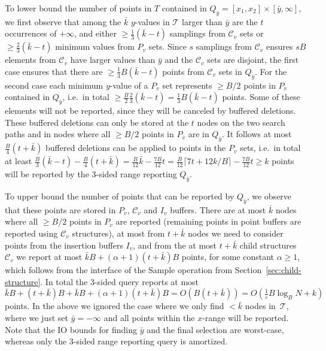 \documentclass[11pt]{article}
\begin{document}
To lower bound the number of points in $T$ contained in
$Q_{\bar{y}}=[x_1,x_2]\times[\bar{y},\infty]$, we first observe that
among the $\bar{k}$ $y$-values in $\mathcal{T}$ larger than $\bar{y}$
are the $t$ occurrences of $+\infty$, and either $\geq
\frac{1}{3}(\bar{k}-t)$ samplings from $\mathcal{C}_v$ sets or $\geq
\frac{2}{3}(\bar{k}-t)$ minimum values from $P_v$ sets. Since $s$
samplings from $\mathcal{C}_v$ ensures $sB$ elements from
$\mathcal{C}_v$ have larger values than $\bar{y}$ and the
$\mathcal{C}_v$ sets are disjoint, the first case ensures that there
are $\geq \frac{1}{3}B(\bar{k}-t)$ points from $\mathcal{C}_v$ sets in
$Q_{\bar{y}}$. For the second case each minimum $y$-value of a $P_v$
set represents $\geq B/2$ points in $P_v$ contained in $Q_{\bar{y}}$,
i.e.\ in total $\geq
\frac{B}{2}\frac{2}{3}(\bar{k}-t)=\frac{1}{3}B(\bar{k}-t)$
points. Some of these elements will not be reported, since they will
be canceled by buffered deletions. These buffered deletions can only
be stored at the $t$ nodes on the two search paths and in nodes where
all $\geq B/2$ points in $P_v$ are in $Q_{\bar{y}}$. It follows at
most $\frac{B}{4}(t+\bar{k})$ buffered deletions can be applied to
points in the $P_v$ sets, i.e.\ in total at least
$\frac{B}{3}(\bar{k}-t) - \frac{B}{4}(t+\bar{k})
=\frac{B}{12}\bar{k}-\frac{7B}{12}t
=\frac{B}{12}\lceil 7t+12k/B\rceil-\frac{7B}{12}t
\geq k$ points will be reported by the 3-sided range reporting $Q_{\bar{y}}$.

To upper bound the number of points that can be reported by
$Q_{\bar{y}}$, we observe that these points are stored in $P_v$,
$\mathcal{C}_v$ and $I_v$ buffers. There are at most $\bar{k}$ nodes
where all $\geq B/2$ points in $P_v$ are reported (remaining points in
point buffers are reported using $\mathcal{C}_v$ structures), at most
from $t+\bar{k}$ nodes we need to consider points from the insertion
buffers $I_v$, and from the at most $t+\bar{k}$ child
structures~$\mathcal{C}_v$ we report at most
$\bar{k}B+(\alpha+1)(t+\bar{k})B$ points, for some constant $\alpha
\geq 1$, which follows from the interface of the Sample operation from
Section~\ref{sec:child-structure}.  In total the 3-sided query reports
at most $\bar{k}B + (t + \bar{k})B+\bar{k}B+(\alpha+1)
(t+\bar{k})B=O(B(t+\bar{k}))=O(\frac{1}{\varepsilon}B\log_B N+k)$
points.
%
In the above we ignored the case where we only find $<\bar{k}$ nodes
in~$\mathcal{T}$, where we just set $\bar{y}=-\infty$ and all points
within the $x$-range will be reported.
%
Note that the IO bounds for finding $\bar{y}$ and the final selection
are worst-case, whereas only the 3-sided range reporting query is
amortized.
\end{document}
